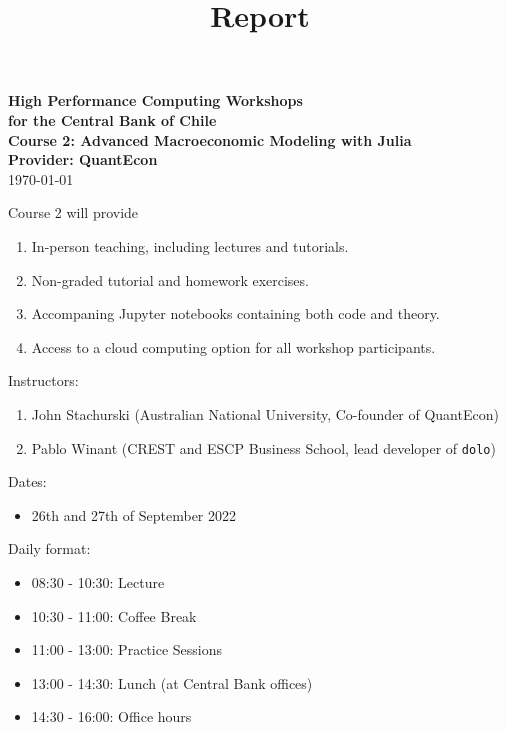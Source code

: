 \documentclass[12pt]{article}
\begin{document}
\title{Report}

\date{}


\begin{center}
    {\bf {\Large High Performance Computing Workshops \\
            for the Central Bank of Chile
    \\
    \vspace{1em}
    {\Large Course 2: Advanced Macroeconomic Modeling with Julia}
    \\
    \vspace{1em}
    Provider: QuantEcon \\
    }}
    \vspace{1em}
    \today
\end{center}


\vspace{.01in}







\thispagestyle{fancy}
Course 2 will provide 
%
\begin{enumerate}
    \item In-person teaching, including lectures and tutorials.
    \item Non-graded tutorial and homework exercises.
    \item Accompaning Jupyter notebooks containing both code and theory.
    \item Access to a cloud computing option for all workshop participants.
\end{enumerate}

Instructors:
%
\begin{enumerate}
    \item John Stachurski (Australian National University, Co-founder of QuantEcon)
    \item Pablo Winant (CREST and ESCP Business School, lead developer of \texttt{dolo})
\end{enumerate}

Dates: 
%
\begin{itemize}
    \item 26th and 27th of September 2022
\end{itemize}

Daily format:
%
\begin{itemize}
    \item 08:30 - 10:30: Lecture
    \item 10:30 - 11:00: Coffee Break
    \item 11:00 - 13:00: Practice Sessions
    \item 13:00 - 14:30: Lunch (at Central Bank offices)
    \item 14:30 - 16:00: Office hours
\end{itemize}
\end{document}
